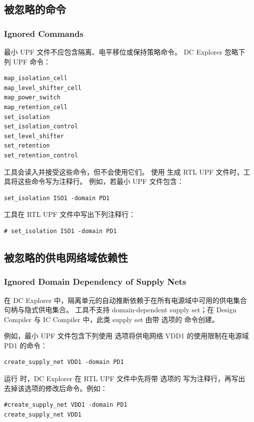 \subsection{被忽略的命令}
\subsubsection*{Ignored Commands}

最小 UPF 文件不应包含隔离、电平移位或保持策略命令。
DC Explorer 忽略下列 UPF 命令：
\begin{lstlisting}
map_isolation_cell
map_level_shifter_cell
map_power_switch
map_retention_cell
set_isolation
set_isolation_control
set_level_shifter
set_retention
set_retention_control
\end{lstlisting}

工具会读入并接受这些命令，但不会使用它们。
使用  生成 RTL UPF 文件时，工具将这些命令写为注释行。
例如，若最小 UPF 文件包含：
\begin{lstlisting}
set_isolation ISO1 -domain PD1
\end{lstlisting}
工具在 RTL UPF 文件中写出下列注释行：
\begin{lstlisting}
# set_isolation ISO1 -domain PD1
\end{lstlisting}

\subsection{被忽略的供电网络域依赖性}
\subsubsection*{Ignored Domain Dependency of Supply Nets}

在 DC Explorer 中，隔离单元的自动推断依赖于在所有电源域中可用的供电集合句柄与隐式供电集合。
工具不支持 domain-dependent supply set；在 Design Compiler 与 IC Compiler 中，此类 supply set 由带  选项的  命令创建。

例如，最小 UPF 文件包含下列使用  选项将供电网络 VDD1 的使用限制在电源域 PD1 的命令：
\begin{lstlisting}
create_supply_net VDD1 -domain PD1
\end{lstlisting}

运行  时，DC Explorer 在 RTL UPF 文件中先将带  选项的  写为注释行，再写出去掉该选项的修改后命令。例如：
\begin{lstlisting}
#create_supply_net VDD1 -domain PD1
create_supply_net VDD1
\end{lstlisting}

